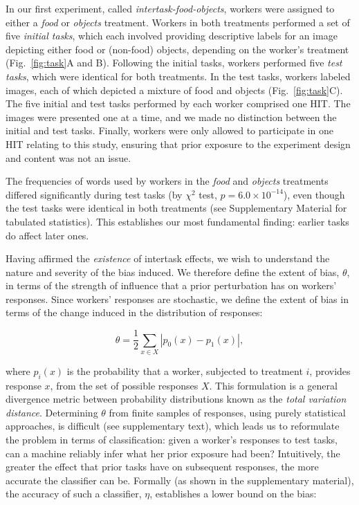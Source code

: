 \documentclass{pnastwo}
\begin{document}
\begin{article}
In our first experiment, called \textit{intertask-food-objects}, workers were
assigned to either a \textit{food} or \textit{objects} treatment.  Workers in
both treatments performed a set of five \textit{initial tasks}, which each
involved providing descriptive labels for an image depicting either food or
(non-food) objects, depending on the worker's treatment (Fig.~\ref{fig:task}A
and B).  Following the initial tasks, workers performed five \textit{test
tasks}, which were identical for both treatments.  In the test tasks, workers
labeled images, each of which depicted a mixture of food and objects
(Fig.~\ref{fig:task}C).  The five initial and test tasks performed by each
worker comprised one HIT. The images were presented one at a time, and we made
no distinction between the initial and test tasks. Finally, workers were only
allowed to participate in one HIT relating to this study, ensuring that prior
exposure to the experiment design and content was not an issue.

The frequencies of words used by workers in the \textit{food} and
\textit{objects} treatments differed significantly during test tasks (by
$\chi^2$ test, $p = 6.0 \times 10^{-14}$), even though the test tasks were
identical in both treatments (see Supplementary Material for tabulated
statistics).  This establishes our most fundamental finding: earlier tasks do affect
later ones. %

Having affirmed the \textit{existence} of intertask effects, we wish to
understand the nature and severity of the bias induced.  We therefore define
the extent of bias, $\theta$, in terms of the strength of influence that a
prior perturbation has on workers' responses.  Since workers' responses are
stochastic, we define the extent of bias in terms of the change induced in the
distribution of responses:

\begin{equation}
	\theta = \frac{1}{2}\sum_{x \in X} \left| p_0(x) - p_1(x) \right|,
	\label{eq:theta}
\end{equation}

where $p_i(x)$ is the probability that a worker, subjected to treatment $i$,
provides response $x$, from the set of possible responses $X$. This formulation
is a general divergence metric between probability distributions known as the
{\it total variation distance}. Determining $\theta$ from finite samples of
responses, using purely statistical approaches, is difficult (see supplementary
text), which leads us to reformulate the problem in terms of classification:
given a worker's responses to test tasks, can a machine reliably infer what her
prior exposure had been?  Intuitively, the greater the effect that prior tasks
have on subsequent responses, the more accurate the classifier can be.
Formally (as shown in the supplementary material), the accuracy of such a
classifier, $\eta$, establishes a lower bound on the bias:


\end{article}
\end{document}
